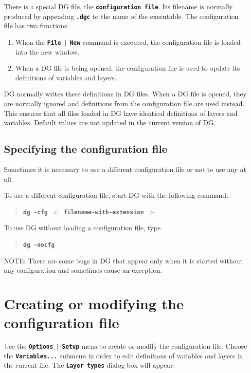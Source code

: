 \documentclass[12pt]{report}
\begin{document}
There is a special DG file, the \textbf{\texttt{configuration file}}.
Its filename is normally produced by appending \textbf{\texttt{.dgc}}
to the name of the executable. The configuration file has two
functions:
\begin{enumerate}
  \item When the \textbf{\texttt{File \begin{math}\vert{}\end{math} New}}
command is executed, the configuration file is loaded into the new
window.
  \item When a DG file is being opened, the configuration file is used to
update its definitions of variables and layers.
\end{enumerate}

DG normally writes these definitions in DG files. When a DG file is
opened, they are normally ignored and definitions from the
configuration file are used instead. This ensures that all files loaded
in DG have identical definitions of layers and variables.
Default values are not updated in the current version of DG.

\subsection{Specifying the configuration file}

Sometimes it is necessary to use a different configuration file or not
to use any at all.

To use a different configuration file, start DG with the following
command:
\begin{quote}
\textbf{\texttt{dg -cfg
 \begin{math}<\end{math} filename-with-extension \begin{math}>\end{math} }}
\end{quote}
To use DG without loading a configuration file, type
\begin{quote}
\textbf{\texttt{dg -nocfg}}
\end{quote}
NOTE: There are some bugs in DG that appear only when it is started
without any configuration and sometimes cause an exception.

\section{Creating or modifying the configuration file}

Use the \textbf{\texttt{Options \begin{math}\vert{}\end{math} Setup}}
menu to create or modify the configuration file.
Choose the \textbf{\texttt{Variables...}} submenu
in order to edit definitions of
variables and layers in the current file. The \textbf{\texttt{Layer
types}} dialog box will appear.
\end{document}
